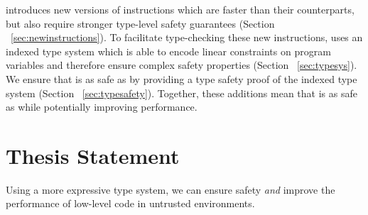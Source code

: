 \name introduces new versions of \wasm instructions which are faster than their \wasm counterparts, but also require stronger type-level safety guarantees (Section ~\ref{sec:newinstructions}).
To facilitate type-checking these new instructions, \name uses an indexed type system which is able to encode linear constraints on program variables and therefore ensure complex safety properties (Section ~\ref{sec:typesys}).
We ensure that \name is as safe as \wasm by providing a type safety proof of the \name indexed type system (Section ~\ref{sec:typesafety}).
Together, these additions mean that \name is as safe as \wasm while potentially improving performance.

\section{Thesis Statement}
\begin{adjustwidth}{1cm}{1cm}
    Using a more expressive type system, we can ensure safety \emph{and} improve the performance of low-level code in untrusted environments.
\end{adjustwidth}
